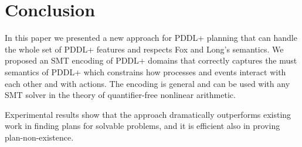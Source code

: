 \section{Conclusion}\label{sec:conclusion}

In this paper we presented a new approach for PDDL+ planning
that can handle the whole set of PDDL+ features and
respects Fox and Long’s semantics. We proposed an SMT encoding of PDDL+ domains that correctly captures the must semantics of PDDL+ which constrains how processes and events interact with each other and with actions. The encoding is general and can be used with any SMT solver in the theory of quantifier-free nonlinear arithmetic.

Experimental results show that the approach dramatically outperforms existing work in finding plans for solvable problems, and it is efficient also in proving plan-non-existence.